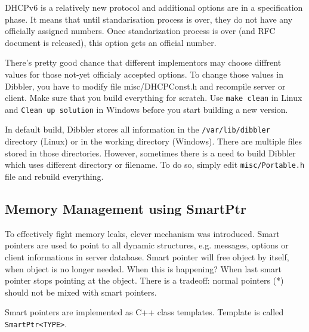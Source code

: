 DHCPv6 is a relatively new protocol and additional options are in a
specification phase. It means that until standarisation process is
over, they do not have any officially assigned numbers. Once
standarization process is over (and RFC document is released), this
option gets an official number. 

There's pretty good chance that different implementors may choose
diffrent values for those not-yet officialy accepted options. To
change those values in Dibbler, you have to modify file
misc/DHCPConst.h and recompile server or client. Make sure that you
build everything for scratch. Use \verb+make clean+ in Linux and
\verb+Clean up solution+ in Windows before you start building a new
version.

In default build, Dibbler stores all information in the
\verb+/var/lib/dibbler+ directory (Linux) or in the working directory
(Windows). There are multiple files stored in those
directories. However, sometimes there is a need to build Dibbler which uses
different directory or filename. To do so, simply edit
\verb+misc/Portable.h+ file and rebuild everything.

\subsection{Memory Management using SmartPtr}
To effectively fight memory leaks, clever mechanism was
introduced. Smart pointers are used to point to all dynamic
structures, e.g. messages, options or client informations in server
database. Smart pointer will free object by itself, when object is no
longer needed. When this is happening? When last smart pointer stops
pointing at the object. There is a tradeoff: normal pointers (*)
should not be mixed with smart pointers. 

Smart pointers are implemented as C++ class templates. Template is
called \verb+SmartPtr<TYPE>+.

